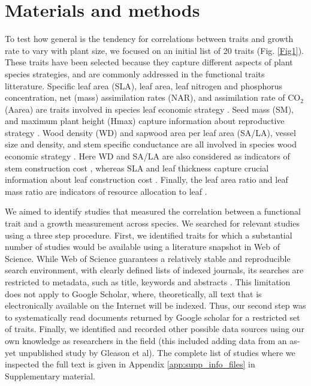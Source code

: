 \documentclass[a4paper]{article}\usepackage[]{graphicx}\usepackage[]{color}
\begin{document}
\section*{Materials and methods}\label{material-and-methods}

To test how general is the tendency for correlations between traits and growth rate to vary with plant size, we focused on an initial list of 20 traits (Fig. \ref{Fig1}). These traits have been selected because they capture different aspects of plant species strategies, and are commonly addressed in the functional traits litterature. Specific leaf area (SLA), leaf area, leaf nitrogen and phosphorus concentration, net (mass) assimilation rates (NAR), and assimilation rate of CO$_2$ (Aarea) are traits involved in species leaf economic strategy \citep{Wright:2004jb,Wright:2010tp}. Seed mass (SM), and maximum plant height (Hmax) capture information about reproductive strategy \citep{Falster:2005bw,Moles:2006ft}. Wood density (WD) and sapwood area per leaf area (SA/LA), vessel size and density, and stem specific conductance are all involved in species wood economic strategy \citep{Chave:2009iy}. Here WD and SA/LA are also considered as indicators of stem construction cost \citep{Falster:2011ii}, whereas SLA and leaf thickness capture crucial information about leaf construction cost \citep{Wright:2004jb}. Finally, the leaf area ratio and leaf mass ratio are indicators of resource allocation to leaf \citep{Lambers:1992bj}.

We aimed to identify studies that measured the correlation between a functional trait and a growth measurement across species. We searched for relevant studies using a three step procedure. First, we identified traits for which a substantial number of studies would be available using a literature snapshot in Web of Science. While Web of Science guarantees a relatively stable and reproducible search environment, with clearly defined lists of indexed journals, its searches are restricted to metadata, such as title, keywords and abstracts \citep{Beckmann:2012hn}. This limitation does not apply to Google Scholar, where, theoretically, all text that is electronically available on the Internet will be indexed. Thus, our second step was to systematically read documents returned by Google scholar for a restricted set of traits. Finally, we identified and recorded other possible data sources using our own knowledge as researchers in the field (this included adding data from an as-yet unpublished study by Gleason et al). The complete list of studies where we inspected the full text is given in Appendix \ref{app:supp_info_files} in Supplementary material.
\end{document}

